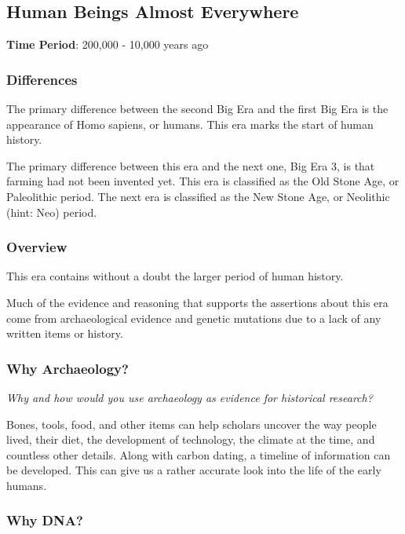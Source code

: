 \documentclass[11pt]{article}
\begin{document}
\subsection{Human Beings Almost Everywhere}
\label{sec:orga8eda67}

\textbf{Time Period}: 200,000 - 10,000 years ago

\subsubsection{Differences}
\label{sec:org454db9b}

The primary difference between the second Big Era and the first Big Era is the appearance of Homo sapiens, or humans. This era marks the start of human history.

The primary difference between this era and the next one, Big Era 3, is that farming had not been invented yet. This era is classified as the Old Stone Age, or Paleolithic period. The next era is classified as the New Stone Age, or Neolithic (hint: Neo) period.

\subsubsection{Overview}
\label{sec:orgc4ee58c}

This era contains without a doubt the larger period of human history.

Much of the evidence and reasoning that supports the assertions about this era come from archaeological evidence and genetic mutations due to a lack of any written items or history.

\subsubsection{Why Archaeology?}
\label{sec:orgbbcbbe7}

\emph{Why and how would you use archaeology as evidence for historical research?}

Bones, tools, food, and other items can help scholars uncover the way people lived, their diet, the development of technology, the climate at the time, and countless other details. Along with carbon dating, a timeline of information can be developed. This can give us a rather accurate look into the life of the early humans.

\subsubsection{Why DNA?}
\label{sec:org0179482}
\end{document}
